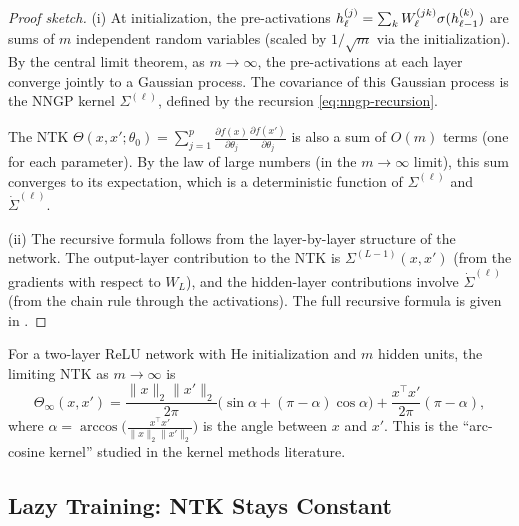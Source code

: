 \documentclass[11pt,a4paper]{article}
\begin{document}
\begin{proof}[Proof sketch]
(i) At initialization, the pre-activations
$h_\ell^{(j)} = \sum_k W_\ell^{(jk)} \sigma(h_{\ell-1}^{(k)})$
are sums of $m$ independent random variables (scaled by $1/\sqrt{m}$
via the initialization).  By the central limit theorem, as $m \to
\infty$, the pre-activations at each layer converge jointly to a
Gaussian process.  The covariance of this Gaussian process is the
NNGP kernel $\Sigma^{(\ell)}$, defined by the recursion
\eqref{eq:nngp-recursion}.

The NTK $\Theta(x, x'; \theta_0) = \sum_{j=1}^p
\frac{\partial f(x)}{\partial \theta_j}
\frac{\partial f(x')}{\partial \theta_j}$ is also a sum of $O(m)$
terms (one for each parameter).  By the law of large numbers (in the
$m \to \infty$ limit), this sum converges to its expectation, which
is a deterministic function of $\Sigma^{(\ell)}$ and
$\dot{\Sigma}^{(\ell)}$.

(ii) The recursive formula follows from the layer-by-layer structure
of the network.  The output-layer contribution to the NTK is
$\Sigma^{(L-1)}(x, x')$ (from the gradients with respect to
$W_L$), and the hidden-layer contributions involve
$\dot{\Sigma}^{(\ell)}$ (from the chain rule through the
activations).  The full recursive formula is given in
\citet{jacot2018}.
\end{proof}

\begin{example}
\label{ex:ntk-relu}
For a two-layer ReLU network with He initialization and $m$ hidden
units, the limiting NTK as $m \to \infty$ is
\[
  \Theta_\infty(x, x') = \frac{\|x\|_2 \|x'\|_2}{2\pi}
    \bigl( \sin\alpha + (\pi - \alpha) \cos\alpha \bigr)
    + \frac{x^\top x'}{2\pi} (\pi - \alpha),
\]
where $\alpha = \arccos\bigl( \frac{x^\top x'}{\|x\|_2 \|x'\|_2}
\bigr)$ is the angle between $x$ and $x'$.  This is the ``arc-cosine
kernel'' studied in the kernel methods literature.
\end{example}

\subsection{Lazy Training: NTK Stays Constant}
\end{document}
